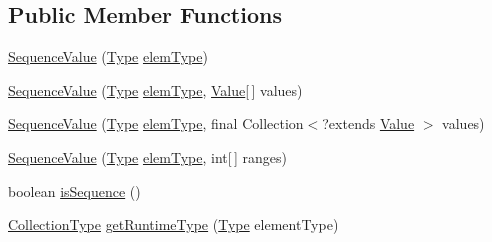 \subsection*{Public Member Functions}
\begin{DoxyCompactItemize}
\item 
\hyperlink{classorg_1_1tzi_1_1use_1_1uml_1_1ocl_1_1value_1_1_sequence_value_a5632e50ea59084c9a51744d65015b300}{Sequence\-Value} (\hyperlink{interfaceorg_1_1tzi_1_1use_1_1uml_1_1ocl_1_1type_1_1_type}{Type} \hyperlink{classorg_1_1tzi_1_1use_1_1uml_1_1ocl_1_1value_1_1_collection_value_a2e9a9c4cae1e0db7c9f855fe0ba61792}{elem\-Type})
\item 
\hyperlink{classorg_1_1tzi_1_1use_1_1uml_1_1ocl_1_1value_1_1_sequence_value_a17f624f6cbc58c44f47fc3aca212e66d}{Sequence\-Value} (\hyperlink{interfaceorg_1_1tzi_1_1use_1_1uml_1_1ocl_1_1type_1_1_type}{Type} \hyperlink{classorg_1_1tzi_1_1use_1_1uml_1_1ocl_1_1value_1_1_collection_value_a2e9a9c4cae1e0db7c9f855fe0ba61792}{elem\-Type}, \hyperlink{classorg_1_1tzi_1_1use_1_1uml_1_1ocl_1_1value_1_1_value}{Value}\mbox{[}$\,$\mbox{]} values)
\item 
\hyperlink{classorg_1_1tzi_1_1use_1_1uml_1_1ocl_1_1value_1_1_sequence_value_ad923d8a9a21392449ffea7f44f5189f2}{Sequence\-Value} (\hyperlink{interfaceorg_1_1tzi_1_1use_1_1uml_1_1ocl_1_1type_1_1_type}{Type} \hyperlink{classorg_1_1tzi_1_1use_1_1uml_1_1ocl_1_1value_1_1_collection_value_a2e9a9c4cae1e0db7c9f855fe0ba61792}{elem\-Type}, final Collection$<$?extends \hyperlink{classorg_1_1tzi_1_1use_1_1uml_1_1ocl_1_1value_1_1_value}{Value} $>$ values)
\item 
\hyperlink{classorg_1_1tzi_1_1use_1_1uml_1_1ocl_1_1value_1_1_sequence_value_a123fc42009f537561c2b90837ab02505}{Sequence\-Value} (\hyperlink{interfaceorg_1_1tzi_1_1use_1_1uml_1_1ocl_1_1type_1_1_type}{Type} \hyperlink{classorg_1_1tzi_1_1use_1_1uml_1_1ocl_1_1value_1_1_collection_value_a2e9a9c4cae1e0db7c9f855fe0ba61792}{elem\-Type}, int\mbox{[}$\,$\mbox{]} ranges)
\item 
boolean \hyperlink{classorg_1_1tzi_1_1use_1_1uml_1_1ocl_1_1value_1_1_sequence_value_ac70c4eca9d134aab79e4fa327150fac7}{is\-Sequence} ()
\item 
\hyperlink{classorg_1_1tzi_1_1use_1_1uml_1_1ocl_1_1type_1_1_collection_type}{Collection\-Type} \hyperlink{classorg_1_1tzi_1_1use_1_1uml_1_1ocl_1_1value_1_1_sequence_value_a3c14d5ef67142a141fc5dcd25fb0edb5}{get\-Runtime\-Type} (\hyperlink{interfaceorg_1_1tzi_1_1use_1_1uml_1_1ocl_1_1type_1_1_type}{Type} element\-Type)
\item 

\end{DoxyCompactItemize}
